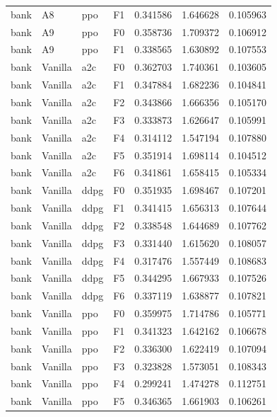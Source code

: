 \begin{tabular}{llllrrr}
      bank &      A8 &       ppo &  F1 &  0.341586 &  1.646628 &  0.105963 \\
      bank &      A9 &       ppo &  F0 &  0.358736 &  1.709372 &  0.106912 \\
      bank &      A9 &       ppo &  F1 &  0.338565 &  1.630892 &  0.107553 \\
      bank & Vanilla &       a2c &  F0 &  0.362703 &  1.740361 &  0.103605 \\
      bank & Vanilla &       a2c &  F1 &  0.347884 &  1.682236 &  0.104841 \\
      bank & Vanilla &       a2c &  F2 &  0.343866 &  1.666356 &  0.105170 \\
      bank & Vanilla &       a2c &  F3 &  0.333873 &  1.626647 &  0.105991 \\
      bank & Vanilla &       a2c &  F4 &  0.314112 &  1.547194 &  0.107880 \\
      bank & Vanilla &       a2c &  F5 &  0.351914 &  1.698114 &  0.104512 \\
      bank & Vanilla &       a2c &  F6 &  0.341861 &  1.658415 &  0.105334 \\
      bank & Vanilla &      ddpg &  F0 &  0.351935 &  1.698467 &  0.107201 \\
      bank & Vanilla &      ddpg &  F1 &  0.341415 &  1.656313 &  0.107644 \\
      bank & Vanilla &      ddpg &  F2 &  0.338548 &  1.644689 &  0.107762 \\
      bank & Vanilla &      ddpg &  F3 &  0.331440 &  1.615620 &  0.108057 \\
      bank & Vanilla &      ddpg &  F4 &  0.317476 &  1.557449 &  0.108683 \\
      bank & Vanilla &      ddpg &  F5 &  0.344295 &  1.667933 &  0.107526 \\
      bank & Vanilla &      ddpg &  F6 &  0.337119 &  1.638877 &  0.107821 \\
      bank & Vanilla &       ppo &  F0 &  0.359975 &  1.714786 &  0.105771 \\
      bank & Vanilla &       ppo &  F1 &  0.341323 &  1.642162 &  0.106678 \\
      bank & Vanilla &       ppo &  F2 &  0.336300 &  1.622419 &  0.107094 \\
      bank & Vanilla &       ppo &  F3 &  0.323828 &  1.573051 &  0.108343 \\
      bank & Vanilla &       ppo &  F4 &  0.299241 &  1.474278 &  0.112751 \\
      bank & Vanilla &       ppo &  F5 &  0.346365 &  1.661903 &  0.106261 \\

\end{tabular}
